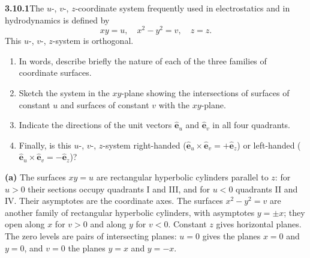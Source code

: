 \par\bigskip
\noindent\textbf{3.10.1}\quad The $u$-, $v$-, $z$-coordinate system frequently
used in electrostatics and in hydrodynamics is defined by
\[
xy=u,\quad x^{2}-y^{2}=v,\quad z=z.
\]
This $u$-, $v$-, $z$-system is orthogonal.
\begin{enumerate}
\item[(a)] In words, describe briefly the nature of each of the three families
  of coordinate surfaces.
\item[(b)] Sketch the system in the $xy$-plane showing the intersections of
  surfaces of constant $u$ and surfaces of constant $v$ with the $xy$-plane.
\item[(c)] Indicate the directions of the unit vectors $\hat{\mathbf{e}}_{u}$
  and $\hat{\mathbf{e}}_{v}$ in all four quadrants.
\item[(d)] Finally, is this $u$-, $v$-, $z$-system right-handed
  ($\hat{\mathbf{e}}_{u}\times\hat{\mathbf{e}}_{v}=+\hat{\mathbf{e}}_{z}$) or
  left-handed ($\hat{\mathbf{e}}_{u}\times\hat{\mathbf{e}}_{v}
  =-\hat{\mathbf{e}}_{z}$)?
\end{enumerate}
\solution
\textbf{(a)} The surfaces $xy=u$ are rectangular hyperbolic cylinders
parallel to $z$: for $u>0$ their sections occupy quadrants I and III,
and for $u<0$ quadrants II and IV. Their asymptotes are the coordinate
axes. The surfaces $x^2-y^2=v$ are another family of rectangular
hyperbolic cylinders, with asymptotes $y=\pm x$; they open along $x$
for $v>0$ and along $y$ for $v<0$. Constant $z$ gives horizontal planes.
The zero levels are pairs of intersecting planes: $u=0$ gives the
planes $x=0$ and $y=0$, and $v=0$ the planes $y=x$ and $y=-x$.

